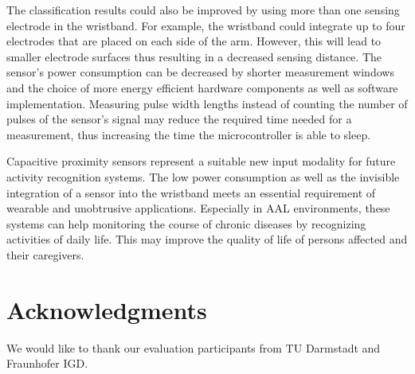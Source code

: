 \documentclass[runningheads,a4paper]{llncs}
\begin{document}
The classification results could also be improved by using more than one sensing electrode in the wristband. For example, the wristband could integrate up to four electrodes that are placed on each side of the arm. However, this will lead to smaller electrode surfaces thus resulting in a decreased sensing distance. The sensor's power consumption can be decreased by shorter measurement windows and the choice of more energy efficient hardware components as well as software implementation. Measuring pulse width lengths instead of counting the number of pulses of the sensor's signal may reduce the required time needed for a measurement, thus increasing the time the microcontroller is able to sleep.

Capacitive proximity sensors represent a suitable new input modality for future activity recognition systems. The low power consumption as well as the invisible integration of a sensor into the wristband meets an essential requirement of wearable and unobtrusive applications. Especially in AAL environments, these systems can help monitoring the course of chronic diseases by recognizing activities of daily life. This may improve the quality of life of persons affected and their caregivers. 

\section*{Acknowledgments}

We would like to thank our evaluation participants from TU Darmstadt and Fraunhofer IGD.



\end{document}
